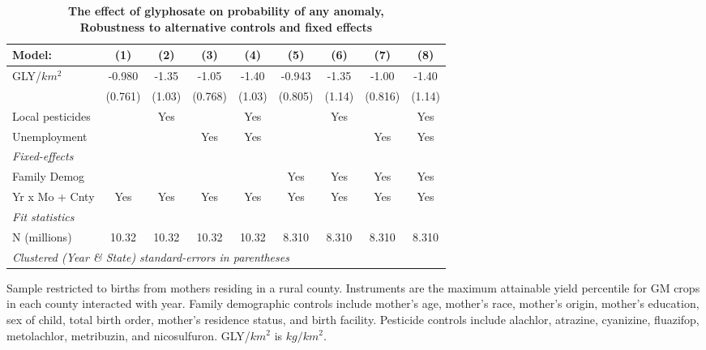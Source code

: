 \begin{table}[htbp]
   \centering
   \small
   \begin{threeparttable}[b]
      \caption{\label{tab:robust-cntrl-any_anomaly-allyielddiffpercentilegmomax} \textbf{The effect of glyphosate on probability of any anomaly, \\ Robustness to alternative controls and fixed effects}}
      \begin{tabular}{lcccccccc}
         \toprule
         Model:           & (1)     & (2)    & (3)     & (4)    & (5)     & (6)    & (7)     & (8)\\  
         \midrule 
         GLY/$km^2$       & -0.980  & -1.35  & -1.05   & -1.40  & -0.943  & -1.35  & -1.00   & -1.40\\   
                          & (0.761) & (1.03) & (0.768) & (1.03) & (0.805) & (1.14) & (0.816) & (1.14)\\   
         Local pesticides &         & Yes    &         & Yes    &         & Yes    &         & Yes\\  
         Unemployment     &         &        & Yes     & Yes    &         &        & Yes     & Yes\\  
         \midrule
         \emph{Fixed-effects}\\
         Family Demog     &         &        &         &        & Yes     & Yes    & Yes     & Yes\\  
         Yr x Mo + Cnty   & Yes     & Yes    & Yes     & Yes    & Yes     & Yes    & Yes     & Yes\\  
         \midrule
         \emph{Fit statistics}\\
         N (millions)     & 10.32   & 10.32  & 10.32   & 10.32  & 8.310   & 8.310  & 8.310   & 8.310\\  
         \midrule
         \multicolumn{9}{l}{\emph{Clustered (Year \& State) standard-errors in parentheses}}\\
      \end{tabular}
      
      \begin{tablenotes}\item Sample restricted to births from mothers residing in a rural county. Instruments are the maximum attainable yield percentile for GM crops in each county interacted with year. Family demographic controls include mother's age, mother's race, mother's origin, mother's education, sex of child, total birth order, mother's residence status, and birth facility. Pesticide controls include alachlor, atrazine, cyanizine, fluazifop, metolachlor, metribuzin, and nicosulfuron. GLY/$km^2$ is $kg/km^2$.
      \end{tablenotes}
   \end{threeparttable}
\end{table}
